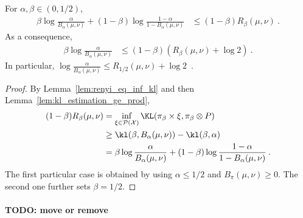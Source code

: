 \begin{theorem}
  \label{thm:log_inv_bayesBinaryRisk_le_renyi}
  For $\alpha, \beta \in (0, 1/2)$,
  \begin{align*}
  \beta \log\frac{\alpha}{B_\alpha(\mu, \nu)} + (1 - \beta) \log\frac{1 - \alpha}{1 - B_\alpha(\mu, \nu)}
  &\le (1 - \beta) R_{\beta}(\mu, \nu)
  \: .
  \end{align*}
  As a consequence,
  \begin{align*}
  \beta \log\frac{\alpha}{B_\alpha(\mu, \nu)}
  &\le (1 - \beta) (R_{\beta}(\mu, \nu) + \log 2)
  \: .
  \end{align*}
  In particular, $\log\frac{\alpha}{B_\alpha(\mu, \nu)} \le R_{1/2}(\mu, \nu) + \log 2$~.
\end{theorem}

\begin{proof}%
{}
By Lemma~\ref{lem:renyi_eq_inf_kl} and then Lemma~\ref{lem:kl_estimation_ge_prod},
\begin{align*}
(1 - \beta) R_{\beta}(\mu, \nu)
&= \inf_{\xi \in \mathcal P(\mathcal X)} \KL(\pi_\beta \times \xi, \pi_\beta \otimes P)
\\
&\ge \kl(\beta, B_\alpha(\mu, \nu)) - \kl(\beta, \alpha)
\\
&= \beta \log\frac{\alpha}{B_\alpha(\mu, \nu)} + (1 - \beta)\log\frac{1 - \alpha}{1 - B_\alpha(\mu, \nu)}
\: .
\end{align*}
The first particular case is obtained by using $\alpha \le 1/2$ and $B_\pi(\mu, \nu) \ge 0$.
The second one further sets $\beta = 1/2$.
\end{proof}





\paragraph{TODO: move or remove}


